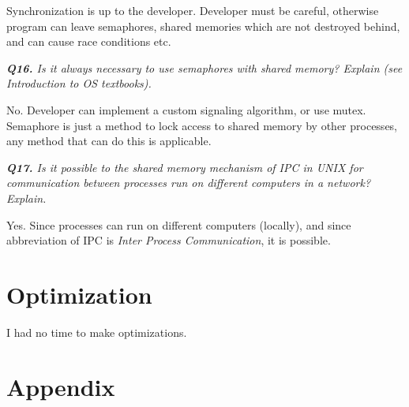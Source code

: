 \documentclass[11pt]{article}
\begin{document}
Synchronization is up to the developer. Developer must be careful, otherwise program can leave semaphores, shared memories which are not destroyed behind, and can cause race conditions etc.

\vspace{5mm}
\textit{\textbf{Q16.} Is it always necessary to use semaphores with shared memory? Explain (see Introduction to OS textbooks).}
\vspace{5mm}

No. Developer can implement a custom signaling algorithm, or use mutex. Semaphore is just a method to lock access to shared memory by other processes, any method that can do this is applicable. 

\vspace{5mm}
\textit{\textbf{Q17.} Is it possible to the shared memory mechanism of IPC in UNIX for communication between processes run on different computers in a network? Explain.}
\vspace{5mm}

Yes. Since processes can run on different computers (locally), and since abbreviation of IPC is \textit{Inter Process Communication}, it is possible.

\section*{Optimization}

I had no time to make optimizations.

\newpage
\section*{Appendix}

\thispagestyle{empty}
\end{document}
